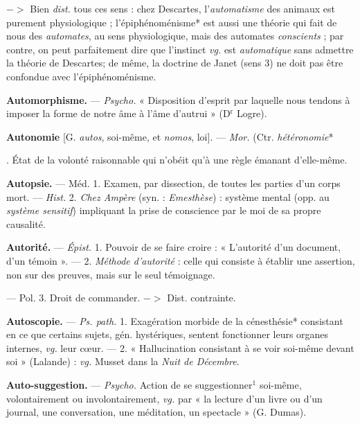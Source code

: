 \begin{itemize}[leftmargin=1cm, label=, itemsep=1pt]
{$->$ Bien {\it dist.} tous ces sens :
chez Descartes, l’{\it automatisme} des
animaux est purement physiologique ; l’épiphénoménisme* est aussi
une théorie qui fait de nous des
{\it automates}, au sens physiologique,
mais des automates {\it conscients} ; par
contre, on peut parfaitement dire
que l'instinct {\it vg.} est {\it automatique}
sans admettre la théorie de Descartes; de même, la doctrine de
Janet (sens 3) ne doit pas être confondue avec l’épiphénoménisme.

\item {\bf Automorphisme.} — \textsf{\textit {Psycho.}} « Disposition d'esprit par laquelle nous
tendons à imposer la forme de notre
âme à l’âme d’autrui » (D$^\text{r}$ Logre).

\item {\bf Autonomie} [G. {\it autos}, soi-même, et
{\it nomos}, loi]. — \textsf{\textit {Mor.}} (Ctr. {\it hétéronomie}*}. État de la volonté
raisonnable qui n’obéit qu'à une règle
émanant d’elle-même.

\item {\bf Autopsie.} — Méd. 1. Examen, par dissection, de toutes les parties d’un
corps mort. — \textsf{\textit {Hist.}} 2. {\it Chez Ampère}
(syn. : {\it Emesthèse}) : système mental
(opp. au {\it système sensitif}) impliquant
la prise de conscience par le moi de
sa propre causalité.

\item {\bf Autorité.} — \textsf{\textit {Épist.}} 1. Pouvoir de se
faire croire : « L'autorité d’un document, d'un témoin ». — 2. {\it Méthode
d'autorité} : celle qui consiste à établir
une assertion, non sur des preuves,
mais sur le seul témoignage.

— Pol. 3. Droit de commander.
$->$ Dist. contrainte.

\item {\bf Autoscopie.} — \textsf{\textit {Ps. path.}} 1. Exagération morbide de
la cénesthésie* consistant en ce que certains sujets, gén.
hystériques, sentent fonctionner
leurs organes internes, {\it vg.} leur
cœur. — 2. « Hallucination consistant à se voir soi-même devant soi »
(Lalande) : {\it vg.} Musset dans la {\it Nuit
de Décembre}.

\item {\bf Auto-suggestion.} — \textsf{\textit {Psycho.}} Action
de se suggestionner$^1$ soi-même, volontairement ou involontairement,
{\it vg.} par « la lecture d’un livre ou
d’un journal, une conversation, une
méditation, un spectacle » (G.
Dumas).


\end{itemize}

